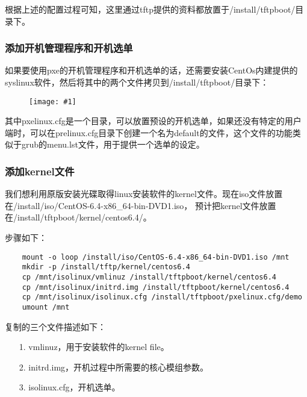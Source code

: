 \documentclass[a4paper,left=1.5cm,right=1.5cm,11pt]{article}
\newcommand{\fic}[1]{\begin{figure}[H]
		\center
		\texttt{[image: \#1]}
	\end{figure}}
\begin{document}
	根据上述的配置过程可知，这里通过tftp提供的资料都放置于/install/tftpboot/目录下。\par

\subsubsection{添加开机管理程序和开机选单}
	如果要使用pxe的开机管理程序和开机选单的话，还需要安装CentOs内建提供的syslinux软件，然后将其中的两个文件拷贝到/install/tftpboot/目录下：
	\fic{3.png}

	其中pxelinux.cfg是一个目录，可以放置预设的开机选单，如果还没有特定的用户端时，可以在prelinux.cfg目录下创建一个名为default的文件，这个文件的功能类似于grub的menu.lst文件，用于提供一个选单的设定。

\subsubsection{添加kernel文件}
	我们想利用原版安装光碟取得linux安装软件的kernel文件。现在iso文件放置在/install/iso/CentOS-6.4-x86\_64-bin-DVD1.iso，
	预计把kernel文件放置在/install/tftpboot/kernel/centos6.4/。\par

	步骤如下：
	\begin{lstlisting}
	mount -o loop /install/iso/CentOS-6.4-x86_64-bin-DVD1.iso /mnt
	mkdir -p /install/tftp/kernel/centos6.4
	cp /mnt/isolinux/vmlinuz /install/tftpboot/kernel/centos6.4
	cp /mnt/isolinux/initrd.img /install/tftpboot/kernel/centos6.4
	cp /mnt/isolinux/isolinux.cfg /install/tftpboot/pxelinux.cfg/demo
	umount /mnt
	\end{lstlisting}

	复制的三个文件描述如下：
	\begin{itemize}
		\item[1.] vmlinuz，用于安装软件的kernel file。
		\item[2.] initrd.img，开机过程中所需要的核心模组参数。
		\item[3.] isolinux.cfg，开机选单。
	\end{itemize}
\end{document}
